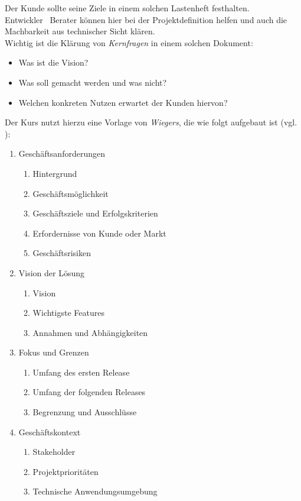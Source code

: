 \noindent
Der Kunde sollte seine Ziele in einem solchen Lastenheft festhalten. \\
Entwickler \ Berater können hier bei der Projektdefinition helfen und auch die Machbarkeit aus technischer Sicht klären.\\

\noindent
Wichtig ist die Klärung von \textit{Kernfragen} in einem solchen Dokument:

\begin{itemize}
    \item Was ist die Vision?
    \item Was soll gemacht werden und was nicht?
    \item Welchen konkreten Nutzen erwartet der Kunden hiervon?
\end{itemize}

\noindent
Der Kurs nutzt hierzu eine Vorlage von \textit{Wiegers}, die wie folgt aufgebaut ist (vgl. \cite[81 ff. sowie 576 ff.]{WJ13}):

\begin{enumerate}
    \item Geschäftsanforderungen
        \begin{enumerate}[label*=\arabic*.]
            \item Hintergrund
            \item Geschäftsmöglichkeit
            \item Geschäftsziele und Erfolgskriterien
            \item Erfordernisse von Kunde oder Markt
            \item Geschäftsrisiken
        \end{enumerate}
    \item Vision der Lösung
        \begin{enumerate}[label*=\arabic*.]
            \item Vision
            \item Wichtigste Features
            \item Annahmen und Abhängigkeiten
        \end{enumerate}
    \item Fokus und Grenzen
        \begin{enumerate}[label*=\arabic*.]
            \item Umfang des ersten Release
            \item Umfang der folgenden Releases
            \item Begrenzung und Ausschlüsse
        \end{enumerate}
    \item Geschäftskontext
        \begin{enumerate}[label*=\arabic*.]
            \item Stakeholder
            \item Projektprioritäten
            \item Technische Anwendungsumgebung
        \end{enumerate}
\end{enumerate}

